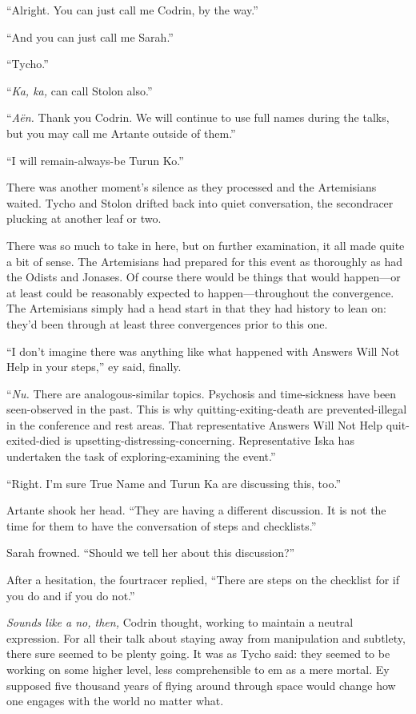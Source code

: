 ``Alright. You can just call me Codrin, by the way.''

``And you can just call me Sarah.''

``Tycho.''

``\emph{Ka, ka,} can call Stolon also.''

``\emph{Aën.} Thank you Codrin. We will continue to use full names during the talks, but you may call me Artante outside of them.''

``I will remain-always-be Turun Ko.''

There was another moment's silence as they processed and the Artemisians waited. Tycho and Stolon drifted back into quiet conversation, the secondracer plucking at another leaf or two.

There was so much to take in here, but on further examination, it all made quite a bit of sense. The Artemisians had prepared for this event as thoroughly as had the Odists and Jonases. Of course there would be things that would happen—or at least could be reasonably expected to happen—throughout the convergence. The Artemisians simply had a head start in that they had history to lean on: they'd been through at least three convergences prior to this one.

``I don't imagine there was anything like what happened with Answers Will Not Help in your steps,'' ey said, finally.

``\emph{Nu.} There are analogous-similar topics. Psychosis and time-sickness have been seen-observed in the past. This is why quitting-exiting-death are prevented-illegal in the conference and rest areas. That representative Answers Will Not Help quit-exited-died is upsetting-distressing-concerning. Representative Iska has undertaken the task of exploring-examining the event.''

``Right. I'm sure True Name and Turun Ka are discussing this, too.''

Artante shook her head. ``They are having a different discussion. It is not the time for them to have the conversation of steps and checklists.''

Sarah frowned. ``Should we tell her about this discussion?''

After a hesitation, the fourtracer replied, ``There are steps on the checklist for if you do and if you do not.''

\emph{Sounds like a no, then,} Codrin thought, working to maintain a neutral expression. For all their talk about staying away from manipulation and subtlety, there sure seemed to be plenty going. It was as Tycho said: they seemed to be working on some higher level, less comprehensible to em as a mere mortal. Ey supposed five thousand years of flying around through space would change how one engages with the world no matter what.


